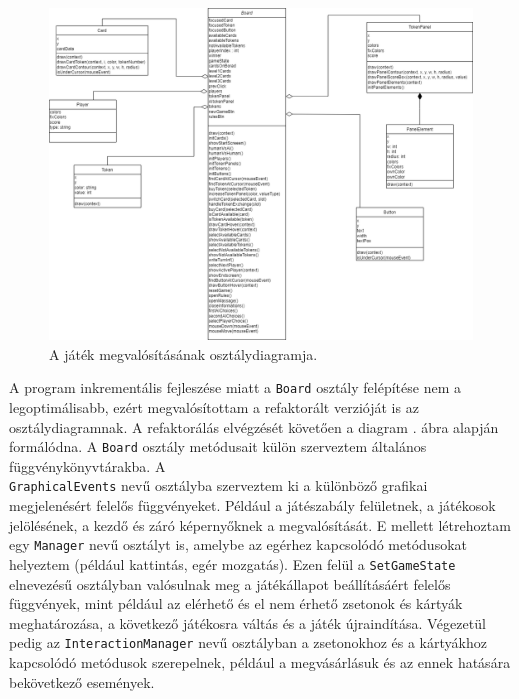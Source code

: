 \begin{figure}[h]
\centering
\includegraphics[width=\textwidth]{images/UML.png}
\caption{A játék megvalósításának osztálydiagramja.}
\label{fig:uml}
\end{figure}

A program inkrementális fejleszése miatt a \texttt{Board} osztály felépítése nem a legoptimálisabb, ezért megvalósítottam a refaktorált verzióját is az osztálydiagramnak. A refaktorálás elvégzését követően a diagram . ábra alapján formálódna. A \texttt{Board} osztály metódusait külön szerveztem általános függvénykönyvtárakba. A \\ \texttt{GraphicalEvents} nevű osztályba szerveztem ki a különböző grafikai megjelenésért felelős függvényeket. Például a játészabály felületnek, a játékosok jelölésének, a kezdő és záró képernyőknek a megvalósítását. E mellett létrehoztam egy \texttt{Manager} nevű osztályt is, amelybe az egérhez kapcsolódó metódusokat helyeztem (például kattintás, egér mozgatás). Ezen felül a \texttt{SetGameState} elnevezésű osztályban valósulnak meg a játékállapot beállításáért felelős függvények, mint például az elérhető és el nem érhető zsetonok és kártyák meghatározása, a következő játékosra váltás és a játék újraindítása. Végezetül pedig az \texttt{InteractionManager} nevű osztályban a zsetonokhoz és a kártyákhoz kapcsolódó metódusok szerepelnek, például a megvásárlásuk és az ennek hatására bekövetkező események.

